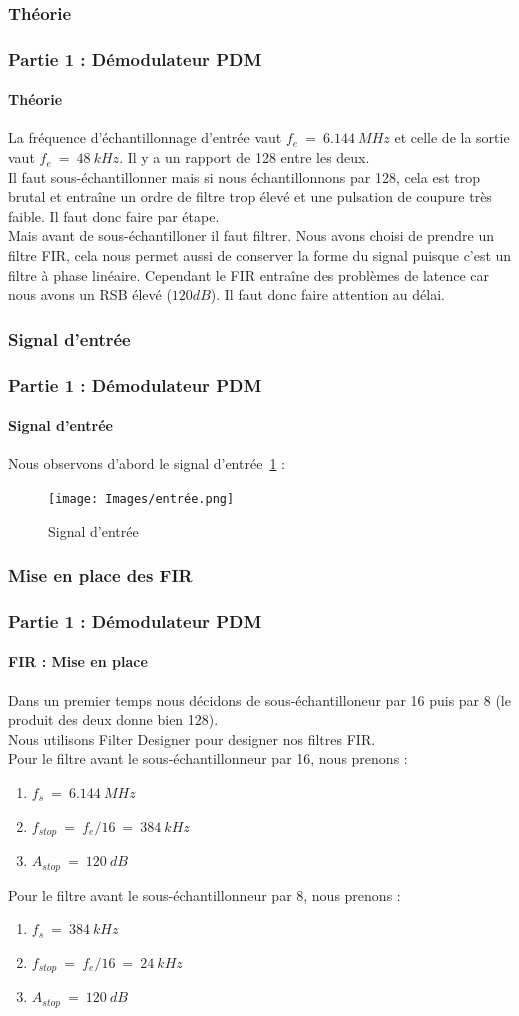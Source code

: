 \documentclass[
10pt,
aspectratio=169,
]{beamer}
\begin{document}
\subsubsection{Théorie}
\begin{frame} 
\frametitle{Partie 1 : Démodulateur PDM} 
\framesubtitle{Théorie} 
La fréquence d'échantillonnage d'entrée vaut $f_e~=~6.144~MHz$ et celle de la sortie vaut $f_e~=~48~kHz$. Il y a un rapport de 128 entre les deux.\\
Il faut sous-échantillonner mais si nous échantillonnons par 128, cela est trop brutal et entraîne un ordre de filtre trop élevé et une pulsation de coupure très faible. Il faut donc faire par étape. \\
Mais avant de sous-échantilloner il faut filtrer. Nous avons choisi de prendre un filtre FIR, cela nous permet aussi de conserver la forme du signal puisque c'est un filtre à phase linéaire. Cependant le FIR entraîne des problèmes de latence car nous avons un RSB élevé ($120 dB$). Il faut donc faire attention au délai.
\end{frame}

\subsubsection{Signal d'entrée}
\begin{frame}
\frametitle{Partie 1 : Démodulateur PDM} 
\framesubtitle{Signal d'entrée} 
Nous observons d'abord le signal d'entrée~\ref{fig:entrée} : 
\begin{figure}[h]
    \centering
    \texttt{[image: Images/entrée.png]}
    \caption{Signal d'entrée}
    \label{fig:entrée}
\end{figure}
\end{frame}

\subsubsection{Mise en place des FIR}
\begin{frame} 
\frametitle{Partie 1 : Démodulateur PDM} 
\framesubtitle{FIR : Mise en place} 
Dans un premier temps nous décidons de sous-échantilloneur par 16 puis par 8 (le produit des deux donne bien 128). \\
Nous utilisons Filter Designer pour designer nos filtres FIR.\\
Pour le filtre avant le sous-échantillonneur par 16, nous prenons : 
\begin{enumerate}
    \item $f_s~=~6.144~MHz$
    \item $f_{stop}~=~f_e/16~=~384~kHz$
    \item $A_{stop}~=~120~dB$
\end{enumerate}
\vspace*{0.7cm}
Pour le filtre avant le sous-échantillonneur par 8, nous prenons : 
\begin{enumerate}
    \item $f_s~=~384~kHz$
    \item $f_{stop}~=~f_e/16~=~24~kHz$
    \item $A_{stop}~=~120~dB$
\end{enumerate}
\end{frame}
\end{document}
